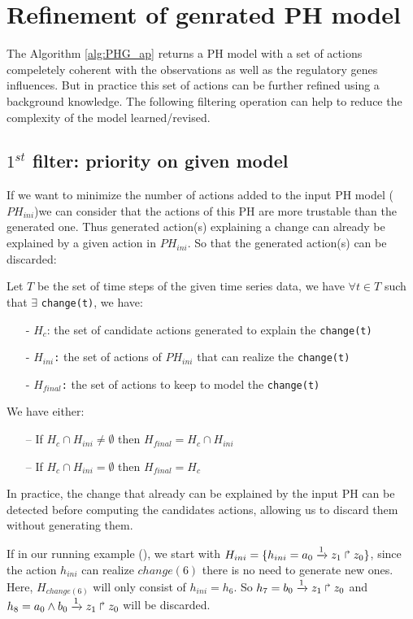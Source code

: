 \section{Refinement of genrated PH model }
The Algorithm \ref{alg:PHG_ap} returns a PH model with a set of actions compeletely coherent with the observations as well as the regulatory genes influences.
But in practice this set of actions can be further refined using a background knowledge.
The following filtering operation can help to reduce the complexity of the model learned/revised.

\subsection{$1^{st}$ filter: priority on given model}

If we want to minimize the number of actions added to the input PH  model ($PH_{ini}$)we can consider that the actions of this PH are more trustable than the generated one. Thus generated action(s) explaining a change can already be explained by a given action in $PH_{ini}$. So that the generated action(s) can be discarded:\\
\begin{definition}
Let $T$ be the set of time steps of the given time series data, we have $\forall t \in T$ such that $\exists$  \texttt{change(t)}, we have:
\begin{itemize}
\item[-] \texttt{$H_c$}: the set of candidate actions generated to explain the \texttt{change(t)}
\item[-] \texttt{$H_{ini}$:} the set of actions of $PH_{ini}$ that can realize the \texttt{change(t)}
\item[-] \texttt{$H_{final}$:} the set of actions to keep to model the \texttt{change(t)}
\end{itemize}
We have either:
\begin{itemize}
\item[--] If $H_c \cap H_{ini} \neq \emptyset $ then $H_{final}= H_c \cap H_{ini}$ 
\item[--] If $H_c \cap H_{ini} = \emptyset $ then $H_{final}=H_c$
\end{itemize}
\end{definition}
In practice, the change that already can be explained by the input PH can be detected before computing the candidates actions, allowing us to discard them without generating them.

If in our running example (),
we start with $H_{ini}=\{h_{ini}=a_0\xrightarrow{1} z_1 \Rsh z_0\}$,
since the action $h_{ini}$ can realize $change(6)$ there is no need to generate new ones.
Here, $H_{change(6)}$ will only consist of $h_{ini} = h_6$. So $h_7=b_0\xrightarrow{1} z_1 \Rsh z_0$ and $h_8=a_0 \wedge b_0 \xrightarrow{1} z_1 \Rsh z_0 $ will be discarded. 

